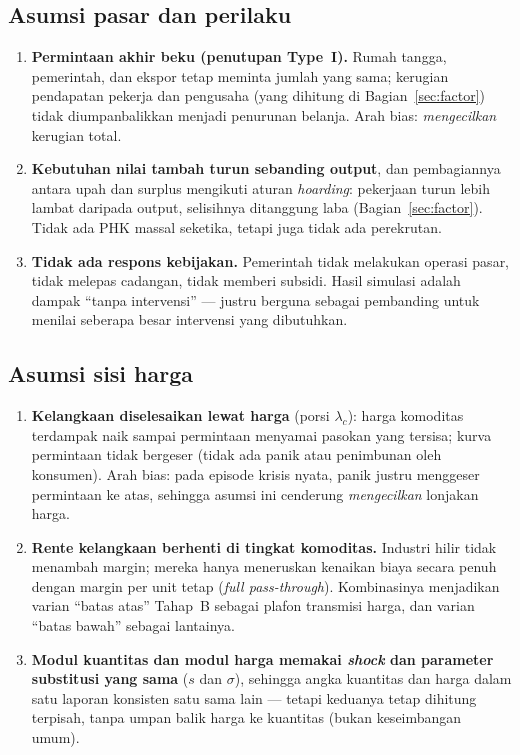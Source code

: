 \documentclass[11pt,a4paper]{article}
\newcommand{\en}[1]{\textit{#1}}   %
\begin{document}
\subsection{Asumsi pasar dan perilaku}

\begin{enumerate}
\item \textbf{Permintaan akhir beku (penutupan Type~I).} Rumah tangga,
      pemerintah, dan ekspor tetap meminta jumlah yang sama; kerugian
      pendapatan pekerja dan pengusaha (yang dihitung di
      Bagian~\ref{sec:factor}) tidak diumpanbalikkan menjadi penurunan
      belanja. Arah bias: \emph{mengecilkan} kerugian total.
\item \textbf{Kebutuhan nilai tambah turun sebanding output}, dan
      pembagiannya antara upah dan surplus mengikuti aturan
      \en{hoarding}: pekerjaan turun lebih lambat daripada output,
      selisihnya ditanggung laba (Bagian~\ref{sec:factor}). Tidak ada
      PHK massal seketika, tetapi juga tidak ada perekrutan.
\item \textbf{Tidak ada respons kebijakan.} Pemerintah tidak melakukan
      operasi pasar, tidak melepas cadangan, tidak memberi subsidi.
      Hasil simulasi adalah dampak ``tanpa intervensi'' --- justru
      berguna sebagai pembanding untuk menilai seberapa besar intervensi
      yang dibutuhkan.
\end{enumerate}

\subsection{Asumsi sisi harga}

\begin{enumerate}
\item \textbf{Kelangkaan diselesaikan lewat harga} (porsi $\lambda_c$):
      harga komoditas terdampak naik sampai permintaan menyamai pasokan
      yang tersisa; kurva permintaan tidak bergeser (tidak ada panik
      atau penimbunan oleh konsumen). Arah bias: pada episode krisis
      nyata, panik justru menggeser permintaan ke atas, sehingga asumsi
      ini cenderung \emph{mengecilkan} lonjakan harga.
\item \textbf{Rente kelangkaan berhenti di tingkat komoditas.} Industri
      hilir tidak menambah margin; mereka hanya meneruskan kenaikan
      biaya secara penuh dengan margin per unit tetap
      (\en{full pass-through}). Kombinasinya menjadikan varian ``batas
      atas'' Tahap~B sebagai plafon transmisi harga, dan varian ``batas
      bawah'' sebagai lantainya.
\item \textbf{Modul kuantitas dan modul harga memakai \en{shock} dan
      parameter substitusi yang sama} ($s$ dan $\sigma$), sehingga angka
      kuantitas dan harga dalam satu laporan konsisten satu sama lain
      --- tetapi keduanya tetap dihitung terpisah, tanpa umpan balik
      harga ke kuantitas (bukan keseimbangan umum).
\end{enumerate}
\end{document}
